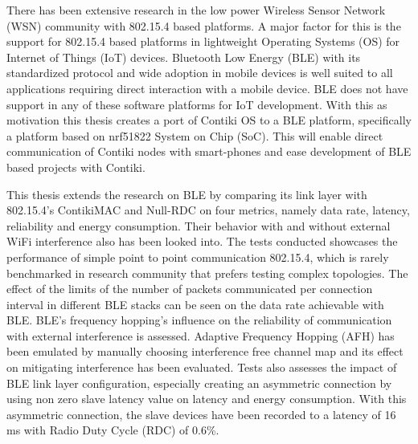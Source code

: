 There has been extensive research in the low power Wireless Sensor Network (WSN) community with 802.15.4 based platforms. A major factor for this is the support for 802.15.4 based platforms in lightweight Operating Systems (OS) for Internet of Things (IoT) devices. Bluetooth Low Energy (BLE) with its standardized protocol and wide adoption in mobile devices is well suited to all applications requiring direct interaction with a mobile device. BLE does not have support in any of these software platforms for IoT development. With this as motivation this thesis creates a port of Contiki OS to a BLE platform, specifically a platform based on nrf51822 System on Chip (SoC). This will enable direct communication of Contiki nodes with smart-phones and ease development of BLE based projects with Contiki.

This thesis extends the research on BLE by comparing its link layer with 802.15.4's ContikiMAC and Null-RDC on four metrics, namely data rate, latency, reliability and energy consumption. Their behavior with and without external WiFi interference also has been looked into. The tests conducted showcases the performance of simple point to point communication 802.15.4, which is rarely benchmarked in research community that prefers testing complex topologies. The effect of the limits of the number of packets communicated per connection interval in different BLE stacks can be seen on the data rate achievable with BLE. BLE's frequency hopping's influence on the reliability of communication with external interference is assessed. Adaptive Frequency Hopping (AFH) has been emulated by manually choosing interference free channel map and its effect on mitigating interference has been evaluated. Tests also assesses the impact of BLE link layer configuration, especially creating an asymmetric connection by using non zero slave latency value on latency and energy consumption. With this asymmetric connection, the slave devices have been recorded to a latency of 16 ms with Radio Duty Cycle (RDC) of 0.6\%. %




